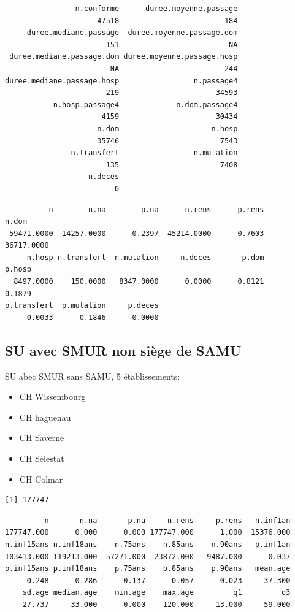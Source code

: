 \documentclass[]{article}
\begin{document}
\begin{verbatim}
                n.conforme      duree.moyenne.passage 
                     47518                        184 
     duree.mediane.passage  duree.moyenne.passage.dom 
                       151                         NA 
 duree.mediane.passage.dom duree.moyenne.passage.hosp 
                        NA                        244 
duree.mediane.passage.hosp                 n.passage4 
                       219                      34593 
           n.hosp.passage4             n.dom.passage4 
                      4159                      30434 
                     n.dom                     n.hosp 
                     35746                       7543 
               n.transfert                 n.mutation 
                       135                       7408 
                   n.deces 
                         0 
\end{verbatim}

\begin{verbatim}
          n        n.na        p.na      n.rens      p.rens       n.dom 
 59471.0000  14257.0000      0.2397  45214.0000      0.7603  36717.0000 
     n.hosp n.transfert  n.mutation     n.deces       p.dom      p.hosp 
  8497.0000    150.0000   8347.0000      0.0000      0.8121      0.1879 
p.transfert  p.mutation     p.deces 
     0.0033      0.1846      0.0000 
\end{verbatim}

\subsection{SU avec SMUR non siège de
SAMU}\label{su-avec-smur-non-siege-de-samu}

SU abec SMUR sans SAMU, 5 établissements:

\begin{itemize}
\itemsep1pt\parskip0pt
\item
  CH Wissembourg
\item
  CH haguenau
\item
  CH Saverne
\item
  CH Sélestat
\item
  CH Colmar
\end{itemize}

\begin{verbatim}
[1] 177747
\end{verbatim}

\begin{verbatim}
         n       n.na       p.na     n.rens     p.rens   n.inf1an 
177747.000      0.000      0.000 177747.000      1.000  15376.000 
n.inf15ans n.inf18ans    n.75ans    n.85ans    n.90ans   p.inf1an 
103413.000 119213.000  57271.000  23872.000   9487.000      0.037 
p.inf15ans p.inf18ans    p.75ans    p.85ans    p.90ans   mean.age 
     0.248      0.286      0.137      0.057      0.023     37.300 
    sd.age median.age    min.age    max.age         q1         q3 
    27.737     33.000      0.000    120.000     13.000     59.000 
\end{verbatim}
\end{document}
